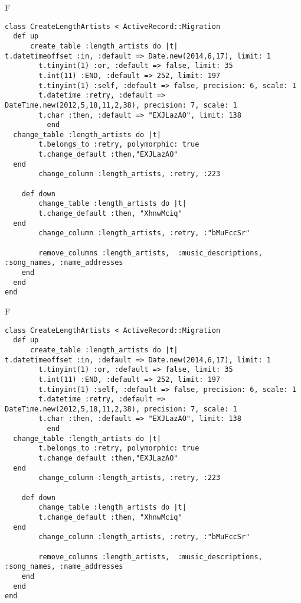 F
\begin{verbatim}
class CreateLengthArtists < ActiveRecord::Migration
  def up
	  create_table :length_artists do |t|
t.datetimeoffset :in, :default => Date.new(2014,6,17), limit: 1
		t.tinyint(1) :or, :default => false, limit: 35
		t.int(11) :END, :default => 252, limit: 197
		t.tinyint(1) :self, :default => false, precision: 6, scale: 1
		t.datetime :retry, :default => DateTime.new(2012,5,18,11,2,38), precision: 7, scale: 1
		t.char :then, :default => "EXJLazAO", limit: 138
		  end
  change_table :length_artists do |t|
		t.belongs_to :retry, polymorphic: true
 		t.change_default :then,"EXJLazAO"
  end
 		change_column :length_artists, :retry, :223
   
	def down
		change_table :length_artists do |t|
		t.change_default :then, "XhnwMciq"
  end
 		change_column :length_artists, :retry, :"bMuFccSr"
   
		remove_columns :length_artists,  :music_descriptions, :song_names, :name_addresses 
    end 
  end
end

\end{verbatim}

F
\begin{verbatim}
class CreateLengthArtists < ActiveRecord::Migration
  def up
	  create_table :length_artists do |t|
t.datetimeoffset :in, :default => Date.new(2014,6,17), limit: 1
		t.tinyint(1) :or, :default => false, limit: 35
		t.int(11) :END, :default => 252, limit: 197
		t.tinyint(1) :self, :default => false, precision: 6, scale: 1
		t.datetime :retry, :default => DateTime.new(2012,5,18,11,2,38), precision: 7, scale: 1
		t.char :then, :default => "EXJLazAO", limit: 138
		  end
  change_table :length_artists do |t|
		t.belongs_to :retry, polymorphic: true
 		t.change_default :then,"EXJLazAO"
  end
 		change_column :length_artists, :retry, :223
   
	def down
		change_table :length_artists do |t|
		t.change_default :then, "XhnwMciq"
  end
 		change_column :length_artists, :retry, :"bMuFccSr"
   
		remove_columns :length_artists,  :music_descriptions, :song_names, :name_addresses 
    end 
  end
end

\end{verbatim}

